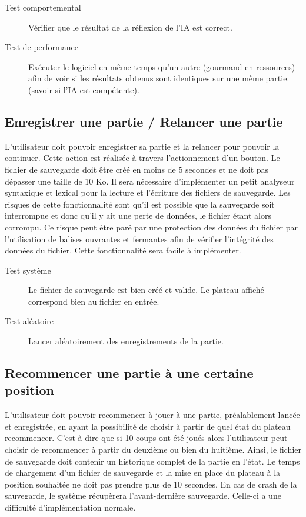\documentclass[a4paper,12pt]{article}
\begin{document}
\begin{description}
\item[Test comportemental] Vérifier que le résultat de la réflexion de l’IA est correct.
\item[Test de performance] Exécuter le logiciel en même temps qu’un autre (gourmand en ressources) afin de voir si les résultats obtenus sont identiques sur une même partie. (savoir si l’IA est compétente).
\end{description}

\subsection{Enregistrer une partie / Relancer une partie}
L'utilisateur doit pouvoir enregistrer sa partie et la relancer pour pouvoir la continuer. Cette action est réalisée à travers l’actionnement d’un bouton. Le fichier de sauvegarde doit être créé en moins de 5 secondes et ne doit pas dépasser une taille de 10 Ko. Il sera nécessaire d'implémenter un petit analyseur syntaxique et lexical pour la lecture et l'écriture des fichiers de sauvegarde. Les risques de cette fonctionnalité sont qu'il est possible que la sauvegarde soit interrompue et donc qu'il y ait une perte de données, le fichier étant alors corrompu. Ce risque peut être paré par une protection des données du fichier par l'utilisation de balises ouvrantes et fermantes afin de vérifier l'intégrité des données du fichier. Cette fonctionnalité sera facile à implémenter.

\begin{description}
\item[Test système] Le fichier de sauvegarde est bien créé et valide. Le plateau affiché correspond bien au fichier en entrée.
\item[Test aléatoire] Lancer aléatoirement des enregistrements de la partie.
\end{description}

\subsection{Recommencer une partie à une certaine position}
L’utilisateur doit pouvoir recommencer à jouer à une partie, préalablement lancée et enregistrée, en ayant la possibilité de choisir à partir de quel état du plateau recommencer. C’est-à-dire que si 10 coups ont été joués alors l’utilisateur peut choisir de recommencer à partir du deuxième ou bien du huitième. Ainsi, le fichier de sauvegarde doit contenir un historique complet de la partie en l'état. Le temps de chargement d'un fichier de sauvegarde et la mise en place du plateau à la position souhaitée ne doit pas prendre plus de 10 secondes. En cas de crash de la sauvegarde, le système récupèrera l'avant-dernière sauvegarde. Celle-ci a une difficulté d'implémentation normale.
\end{document}

